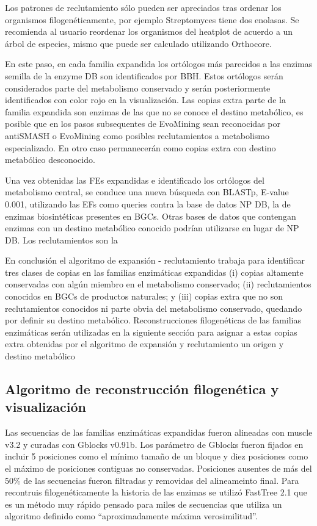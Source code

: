 \documentclass[12pt,twoside]{reedthesis}
\begin{document}
  Los patrones de reclutamiento sólo pueden ser apreciados tras ordenar
  los organismos filogenéticamente, por ejemplo Streptomyces tiene dos
  enolasas. Se recomienda al usuario reordenar los organismos del heatplot
  de acuerdo a un árbol de especies, mismo que puede ser calculado
  utilizando Orthocore.
  
  En este paso, en cada familia expandida los ortólogos más parecidos a
  las enzimas semilla de la enzyme DB son identificados por BBH. Estos
  ortólogos serán considerados parte del metabolismo conservado y serán
  posteriormente identificados con color rojo en la visualización. Las
  copias extra parte de la familia expandida son enzimas de las que no se
  conoce el destino metabólico, es posible que en los pasos subsequentes
  de EvoMining sean reconocidas por antiSMASH o EvoMining como posibles
  reclutamientos a metabolismo especializado. En otro caso permanecerán
  como copias extra con destino metabólico desconocido.
  
  Una vez obtenidas las FEs expandidas e identificado los ortólogos del
  metabolismo central, se conduce una nueva búsqueda con BLASTp, E-value
  0.001, utilizando las EFs como queries contra la base de datos NP DB, la
  de enzimas biosintéticas presentes en BGCs. Otras bases de datos que
  contengan enzimas con un destino metabólico conocido podrían utilizarse
  en lugar de NP DB. Los reclutamientos son la
  
  En conclusión el algoritmo de expansión - reclutamiento trabaja para
  identificar tres clases de copias en las familias enzimáticas expandidas
  (i) copias altamente conservadas con algún miembro en el metabolismo
  conservado; (ii) reclutamientos conocidos en BGCs de productos
  naturales; y (iii) copias extra que no son reclutamientos conocidos ni
  parte obvia del metabolismo conservado, quedando por definir su destino
  metabólico. Reconstrucciones filogenéticas de las familias enzimáticas
  serán utilizadas en la siguiente sección para asignar a estas copias
  extra obtenidas por el algoritmo de expansión y reclutamiento un origen
  y destino metabólico
  
  \subsection{Algoritmo de reconstrucción filogenética y
  visualización}\label{algoritmo-de-reconstruccion-filogenetica-y-visualizacion}
  
  Las secuencias de las familias enzimáticas expandidas fueron alineadas
  con muscle v3.2 y curadas con Gblocks v0.91b. Los parámetro de Gblocks
  fueron fijados en incluir 5 posiciones como el mínimo tamaño de un
  bloque y diez posiciones como el máximo de posiciones contiguas no
  conservadas. Posiciones ausentes de más del 50\% de las secuencias
  fueron filtradas y removidas del alineameinto final. Para recontruis
  filogenéticamente la historia de las enzimas se utilizó FastTree 2.1 que
  es un método muy rápido pensado para miles de secuencias que utiliza un
  algoritmo definido como ``aproximadamente máxima verosimilitud''.
  
\end{document}
